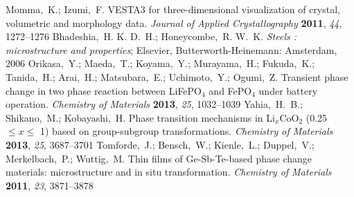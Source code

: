 \documentclass[journal=cmatex,manuscript=article]{achemso}
\begin{document}
\begin{mcitethebibliography}{73}
	Momma,~K.; Izumi,~F. {VESTA}3 for three-dimensional visualization of crystal,
	volumetric and morphology data. \emph{Journal of Applied Crystallography}
	\textbf{2011}, \emph{44}, 1272--1276\relax
	\mciteBstWouldAddEndPuncttrue
	\mciteSetBstMidEndSepPunct{\mcitedefaultmidpunct}
	{\mcitedefaultendpunct}{\mcitedefaultseppunct}\relax
	\EndOfBibitem
	Bhadeshia,~H. K. D.~H.; Honeycombe,~R. W.~K. \emph{Steels : microstructure and
		properties}; Elsevier, Butterworth-Heinemann: Amsterdam, 2006\relax
	\mciteBstWouldAddEndPuncttrue
	\mciteSetBstMidEndSepPunct{\mcitedefaultmidpunct}
	{\mcitedefaultendpunct}{\mcitedefaultseppunct}\relax
	\EndOfBibitem
	Orikasa,~Y.; Maeda,~T.; Koyama,~Y.; Murayama,~H.; Fukuda,~K.; Tanida,~H.;
	Arai,~H.; Matsubara,~E.; Uchimoto,~Y.; Ogumi,~Z. Transient phase change in
	two phase reaction between {LiFePO}$_4$ and {FePO}$_4$ under battery
	operation. \emph{Chemistry of Materials} \textbf{2013}, \emph{25},
	1032--1039\relax
	\mciteBstWouldAddEndPuncttrue
	\mciteSetBstMidEndSepPunct{\mcitedefaultmidpunct}
	{\mcitedefaultendpunct}{\mcitedefaultseppunct}\relax
	\EndOfBibitem
	Yahia,~H.~B.; Shikano,~M.; Kobayashi,~H. Phase transition mechanisms in
	{Li}$_{x}${CoO}$_{2}$ (0.25 $\leq x \leq$ 1) based on group-subgroup
	transformations. \emph{Chemistry of Materials} \textbf{2013}, \emph{25},
	3687--3701\relax
	\mciteBstWouldAddEndPuncttrue
	\mciteSetBstMidEndSepPunct{\mcitedefaultmidpunct}
	{\mcitedefaultendpunct}{\mcitedefaultseppunct}\relax
	\EndOfBibitem
	Tomforde,~J.; Bensch,~W.; Kienle,~L.; Duppel,~V.; Merkelbach,~P.; Wuttig,~M.
	Thin films of {Ge}-{Sb}-{Te}-based phase change materials: microstructure and
	in situ transformation. \emph{Chemistry of Materials} \textbf{2011},
	\emph{23}, 3871--3878\relax
	\mciteBstWouldAddEndPuncttrue
	\mciteSetBstMidEndSepPunct{\mcitedefaultmidpunct}
	{\mcitedefaultendpunct}{\mcitedefaultseppunct}\relax
	\EndOfBibitem

\end{mcitethebibliography}
\end{document}
